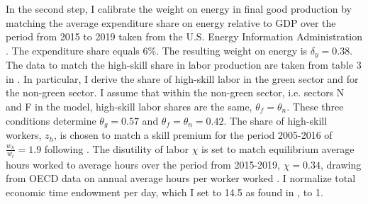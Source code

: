 In the second step, I calibrate the weight on energy in final good production by matching the average expenditure share on energy relative to GDP over the period from 2015 to 2019 taken from the U.S. Energy Information Administration \citep[][Table 1.7]{EIAEnergy}. The expenditure share equals 6\%. The resulting weight on energy is $\delta_y=0.38$.%
 The data to match the high-skill share in labor production are taken from table 3 in \cite{Consoli2016DoCapital}. In particular, I derive the share of high-skill labor in the green sector and for the non-green sector. I assume that within the non-green sector, i.e. sectors N and F in the model, high-skill labor shares are the same, $\theta_f=\theta_n$.  These three conditions determine $\theta_g=0.57$ and $\theta_f=\theta_n=0.42$. The share of high-skill workers, $z_h$, is chosen to match a skill premium for the period 2005-2016 of $\frac{w_h}{w_l}=1.9$ following \cite{Slavik2020WagePremium}. The disutility of labor $\chi$ is set to match equilibrium average hours worked to average hours over the period from 2015-2019, $\chi=0.34$, drawing from OECD data on annual average hours per worker worked \citep{OECDHoursworked}. I normalize total economic time endowment per day, which I set to 14.5 as found in \cite{Jones1993OptimalGrowth}, to 1. 


